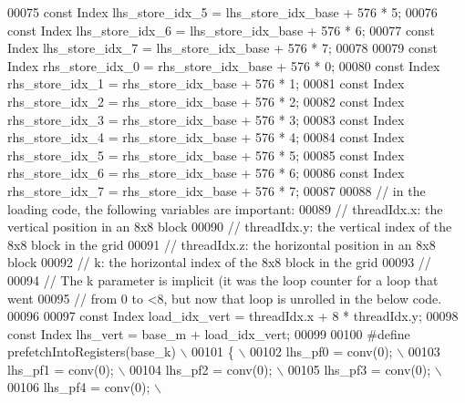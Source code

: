 \begin{DoxyCode}
00075   \textcolor{keyword}{const} Index lhs\_store\_idx\_5 = lhs\_store\_idx\_base + 576 * 5;
00076   \textcolor{keyword}{const} Index lhs\_store\_idx\_6 = lhs\_store\_idx\_base + 576 * 6;
00077   \textcolor{keyword}{const} Index lhs\_store\_idx\_7 = lhs\_store\_idx\_base + 576 * 7;
00078 
00079   \textcolor{keyword}{const} Index rhs\_store\_idx\_0 = rhs\_store\_idx\_base + 576 * 0;
00080   \textcolor{keyword}{const} Index rhs\_store\_idx\_1 = rhs\_store\_idx\_base + 576 * 1;
00081   \textcolor{keyword}{const} Index rhs\_store\_idx\_2 = rhs\_store\_idx\_base + 576 * 2;
00082   \textcolor{keyword}{const} Index rhs\_store\_idx\_3 = rhs\_store\_idx\_base + 576 * 3;
00083   \textcolor{keyword}{const} Index rhs\_store\_idx\_4 = rhs\_store\_idx\_base + 576 * 4;
00084   \textcolor{keyword}{const} Index rhs\_store\_idx\_5 = rhs\_store\_idx\_base + 576 * 5;
00085   \textcolor{keyword}{const} Index rhs\_store\_idx\_6 = rhs\_store\_idx\_base + 576 * 6;
00086   \textcolor{keyword}{const} Index rhs\_store\_idx\_7 = rhs\_store\_idx\_base + 576 * 7;
00087 
00088   \textcolor{comment}{// in the loading code, the following variables are important:}
00089   \textcolor{comment}{// threadIdx.x: the vertical position in an 8x8 block}
00090   \textcolor{comment}{// threadIdx.y: the vertical index of the 8x8 block in the grid}
00091   \textcolor{comment}{// threadIdx.z: the horizontal position in an 8x8 block}
00092   \textcolor{comment}{// k: the horizontal index of the 8x8 block in the grid}
00093   \textcolor{comment}{//}
00094   \textcolor{comment}{// The k parameter is implicit (it was the loop counter for a loop that went}
00095   \textcolor{comment}{// from 0 to <8, but now that loop is unrolled in the below code.}
00096 
00097   \textcolor{keyword}{const} Index load\_idx\_vert = threadIdx.x + 8 * threadIdx.y;
00098   \textcolor{keyword}{const} Index lhs\_vert = base\_m + load\_idx\_vert;
00099 
00100 \textcolor{preprocessor}{#define prefetchIntoRegisters(base\_k)                           \(\backslash\)}
00101 \textcolor{preprocessor}{  \{                                                             \(\backslash\)}
00102 \textcolor{preprocessor}{    lhs\_pf0 = conv(0);                                          \(\backslash\)}
00103 \textcolor{preprocessor}{    lhs\_pf1 = conv(0);                                          \(\backslash\)}
00104 \textcolor{preprocessor}{    lhs\_pf2 = conv(0);                                          \(\backslash\)}
00105 \textcolor{preprocessor}{    lhs\_pf3 = conv(0);                                          \(\backslash\)}
00106 \textcolor{preprocessor}{    lhs\_pf4 = conv(0);                                          \(\backslash\)}

\end{DoxyCode}
